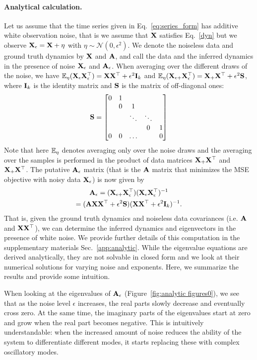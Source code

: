 \documentclass[%
 reprint,
 amsmath,amssymb,
 aps,
]{revtex4-2}
\begin{document}
\paragraph{Analytical calculation.} Let us assume that the time series given in Eq.~\eqref{eq:series_form} has additive white observation noise, that is we assume that $\X$ satisfies Eq.~\eqref{dyn} but we observe $\X_\e=\X + \eta$ with $\eta\sim \mathcal N(0,\epsilon^2)$. We denote the noiseless data and ground truth dynamics by $\X$ and $\A$, and call the data and the inferred dynamics in the presence of noise $\X_\e$ and $\A_\e$. When averaging over the different draws of the noise, we have $\E_\eta(\X_\e\X_\e^\top) = \X\X^\top + \epsilon^2 \I_k$ and $\E_\eta(\X_{\e+}\X_\e^\top) = {\X}_+\X^\top + \epsilon^2 \S$, where $\I_k$ is the identity matrix and $\S$ is the matrix of off-diagonal ones:
\begin{equation*}
    \S=
    \begin{bmatrix}
        0 & 1 &  &   \\
         & 0 & 1 &   \\
         &  & \ddots & \ddots &   \\
         &  &  &  0 & 1 \\
        0 & 0 & \hdots & &0
    \end{bmatrix}
\end{equation*}
Note that here $\E_\eta$ denotes averaging only over the noise draws and the averaging over the samples is performed in the product of data matrices ${\X}_+\X^\top$ and ${\X}_+\X^\top$. The putative $\A_\e$ matrix (that is the $\A$ matrix that minimizes the MSE objective with noisy data $\X_\e$) is now given by
\begin{multline}
    \label{eq:A-noisy}
    \A_\e = (\X_{\e+}\X_\e^\top)(\X_\e\X_\e^\top)^{-1}\\=(\A\X\X^\top+\epsilon^2\S)(\X\X^\top+\epsilon^2\I_k)^{-1}.
\end{multline}
That is, given the ground truth dynamics and noiseless data covariances (i.e. $\A$ and $\X\X^\top$), we can determine the inferred dynamics and eigenvectors in the presence of white noise. We provide further details of this computation in the supplementary materials Sec.~\ref{app:analytic}. While the eigenvalue equations are derived analytically, they are not solvable in closed form and we look at their numerical solutions for varying noise and exponents.
Here, we summarize the results and provide some intuition.

When looking at the eigenvalues of $\A_\e$ (Figure~\ref{fig:analytic figures0}), we see that as the noise level $\epsilon$ increases, the real parts slowly decrease and eventually cross zero. At the same time, the imaginary parts of the eigenvalues start at zero and grow when the real part becomes negative. This is intuitively understandable: when the increased amount of noise reduces the ability of the system to differentiate different modes, it starts replacing these with complex oscillatory modes.
\end{document}
